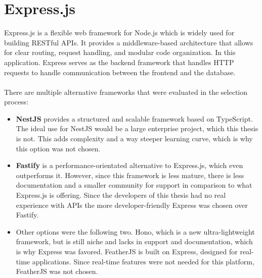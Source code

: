 \documentclass[a4paper,12pt]{report}
\begin{document}
\section{Express.js}
Express.js is a flexible web framework for Node.js which is widely used for building RESTful APIs. It provides a middleware-based architecture that allows for clear routing, request handling, and modular code organization. In this application. Express serves as the backend framework that handles HTTP requests to handle communication between the frontend and the database. \cite{expr-base} \\ \\
There are multiple alternative frameworks that were evaluated in the selection process:
\begin{itemize}
	\item \textbf{NestJS} provides a structured and scalable framework based on TypeScript. The ideal use for NestJS would be a large enterprise project, which this thesis is not. This adds complexity and a way steeper learning curve, which is why this option was not chosen. \cite{expr-comp} \cite{expr-comp2} \cite{nest-js}
	\item \textbf{Fastify} is a performance-orientated alternative to Express.js, which even outperforms it. However, since this framework is less mature, there is less documentation and a smaller community for support in comparison to what Express.js is offering. Since the developers of this thesis had no real experience with APIs the more developer-friendly Express was chosen over Fastify. \cite{expr-comp} \cite{expr-comp2}
	\item Other options were the following two. Hono, which is a new ultra-lightweight framework, but is still niche and lacks in support and documentation, which is why Express was favored. FeatherJS is built on Express, designed for real-time applications. Since real-time features were not needed for this platform, FeatherJS was not chosen. \cite{expr-comp} \cite{expr-comp2} \\
\end{itemize}
\end{document}
